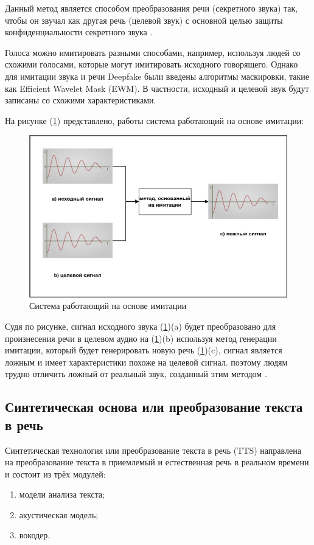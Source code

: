 Данный метод является способом преобразования речи (секретного звука) так, чтобы он звучал как другая речь (целевой звук) с основной целью защиты конфиденциальности секретного звука \cite{detect-fake-imit}.

Голоса можно имитировать разными способами, например, используя людей со схожими голосами, которые могут имитировать исходного говорящего. Однако для имитации звука и речи Deepfake были введены алгоритмы маскировки, такие как Efficient Wavelet Mask (EWM). В частности, исходный и целевой звук будут записаны со схожими характеристиками. 

На рисунке (\ref{fig:imit-deepfake}) представлено, работы система работающий на основе имитации: 
\begin{figure}[H]
	\centering
	\includegraphics[width=0.5\linewidth]{images/imitation-based-deepfake.png}
	\caption{Система работающий на основе имитации}
	\label{fig:imit-deepfake}
\end{figure}

Судя по рисунке, сигнал исходного звука (\ref{fig:imit-deepfake})(a) будет преобразовано для произнесения речи в целевом аудио на (\ref{fig:imit-deepfake})(b) используя метод генерации имитации, который будет генерировать новую речь (\ref{fig:imit-deepfake})(c), сигнал является ложным и имеет характеристики похоже на целевой сигнал. поэтому людям трудно отличить ложный от реальный звук, созданный этим методом \cite{detect-fake-imit}.

\subsection{Синтетическая основа или преобразование текста в речь}

Синтетическая технология или преобразование текста в речь (TTS) направлена на 
преобразование текста в приемлемый и естественная речь в реальном времени \cite{tan2021survey} и состоит из трёх модулей: 

\begin{enumerate}
    \item модели анализа текста;
    \item акустическая модель;
    \item вокодер.
\end{enumerate}

